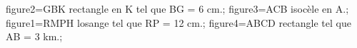 \documentclass[exercice]{thedocument}%
\begin{document}
%
    \>figure2=GBK rectangle en K tel que BG = 6 cm.;%
    \>figure3=ACB isocèle en A.;%
    \>figure1=RMPH losange tel que RP = 12 cm.;%
    \>figure4=ABCD rectangle tel que AB = 3 km.;%
\end{document}
